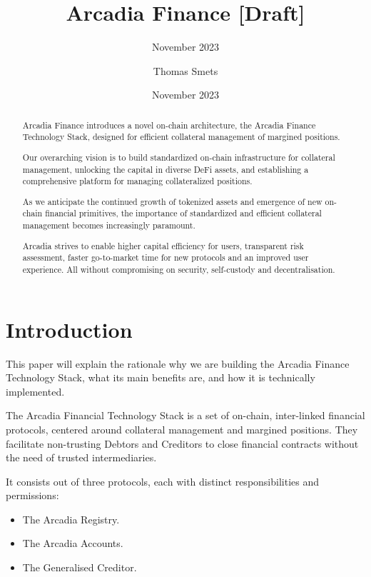 \documentclass[sigconf,nonacm]{acmart}
\title{Arcadia Finance [Draft]}
\subtitle{November 2023}
\date{November 2023}
\author{Thomas Smets}
\affiliation{
    \institution{Arcadia Finance}
    \city{Brussels}
    \country{Belgium}
}
\begin{document}
\begin{abstract}
    Arcadia Finance introduces a novel on-chain architecture, the Arcadia Finance Technology Stack,
    designed for efficient collateral management of margined positions.

    Our overarching vision is to build standardized on-chain infrastructure for collateral management,
    unlocking the capital in diverse DeFi assets, and establishing a comprehensive platform for managing collateralized positions. 

    As we anticipate the continued growth of tokenized assets and emergence of new on-chain financial primitives, 
    the importance of standardized and efficient collateral management becomes increasingly paramount.

    Arcadia strives to enable higher capital efficiency for users, transparent risk assessment,
    faster go-to-market time for new protocols and an improved user experience.
    All without compromising on security, self-custody and decentralisation.
\end{abstract}


\maketitle

\section{Introduction} 
\label{sec:introduction}
This paper will explain the rationale why we are building the Arcadia Finance Technology Stack, what its main benefits are,
and how it is technically implemented.

The Arcadia Financial Technology Stack is a set of on-chain, inter-linked financial protocols,
centered around collateral management and margined positions.
They facilitate non-trusting Debtors and Creditors to close financial contracts without the need of trusted intermediaries.

It consists out of three protocols, each with distinct responsibilities and permissions:
\begin{itemize}
\item The Arcadia Registry.
\item The Arcadia Accounts.
\item The Generalised Creditor.
\end{itemize}
\end{document}
